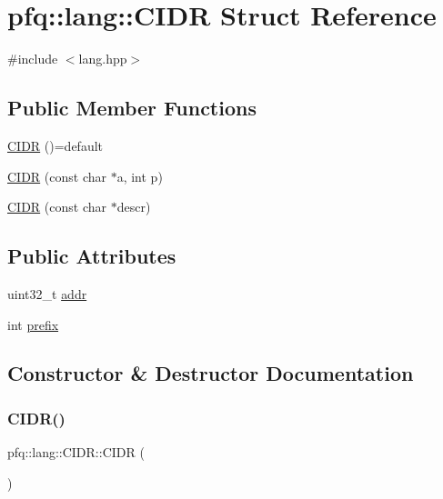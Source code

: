 \hypertarget{structpfq_1_1lang_1_1CIDR}{}\section{pfq\+:\+:lang\+:\+:C\+I\+DR Struct Reference}
\label{structpfq_1_1lang_1_1CIDR}


{\ttfamily \#include $<$lang.\+hpp$>$}

\subsection*{Public Member Functions}
\begin{DoxyCompactItemize}
\item 
\hyperlink{structpfq_1_1lang_1_1CIDR_a4774e75cf93d0e261e5b3a2795b9415c}{C\+I\+DR} ()=default
\item 
\hyperlink{structpfq_1_1lang_1_1CIDR_a691595dd1c05f9c8abb095d9ea36999e}{C\+I\+DR} (const char $\ast$a, int p)
\item 
\hyperlink{structpfq_1_1lang_1_1CIDR_a60c56c26a6af290d8d5175ebc1ed07c7}{C\+I\+DR} (const char $\ast$descr)
\end{DoxyCompactItemize}
\subsection*{Public Attributes}
\begin{DoxyCompactItemize}
\item 
uint32\+\_\+t \hyperlink{structpfq_1_1lang_1_1CIDR_ab386eb2cc0c97917ae9e8a0a4d1fd19b}{addr}
\item 
int \hyperlink{structpfq_1_1lang_1_1CIDR_a1e9458595008285f0831c39e9d87a105}{prefix}
\end{DoxyCompactItemize}


\subsection{Constructor \& Destructor Documentation}
\mbox{\label{structpfq_1_1lang_1_1CIDR_a4774e75cf93d0e261e5b3a2795b9415c}} 
\subsubsection{\texorpdfstring{C\+I\+D\+R()}{CIDR()}\hspace{0.1cm}{\footnotesize\ttfamily [1/3]}}
{\footnotesize\ttfamily pfq\+::lang\+::\+C\+I\+D\+R\+::\+C\+I\+DR (\begin{DoxyParamCaption}{ }\end{DoxyParamCaption})\hspace{0.3cm}{\ttfamily [default]}}

